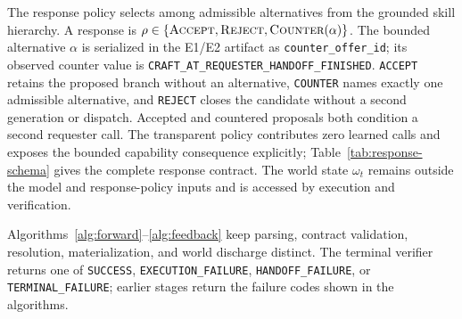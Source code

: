 \documentclass[10pt]{article}
\newcommand{\artifact}[1]{\texttt{#1}}
\begin{document}
The response policy selects among admissible alternatives from the grounded skill hierarchy. A response is $\rho\in\{\textsc{Accept},\textsc{Reject},\textsc{Counter}(\alpha)\}$. The bounded alternative $\alpha$ is serialized in the E1/E2 artifact as \artifact{counter\_offer\_id}; its observed counter value is \artifact{CRAFT\_AT\_REQUESTER\_HANDOFF\_FINISHED}. \artifact{ACCEPT} retains the proposed branch without an alternative, \artifact{COUNTER} names exactly one admissible alternative, and \artifact{REJECT} closes the candidate without a second generation or dispatch. Accepted and countered proposals both condition a second requester call. The transparent policy contributes zero learned calls and exposes the bounded capability consequence explicitly; Table~\ref{tab:response-schema} gives the complete response contract. The world state $\omega_t$ remains outside the model and response-policy inputs and is accessed by execution and verification.

Algorithms~\ref{alg:forward}--\ref{alg:feedback} keep parsing, contract validation, resolution, materialization, and world discharge distinct. The terminal verifier returns one of \artifact{SUCCESS}, \artifact{EXECUTION\_FAILURE}, \artifact{HANDOFF\_FAILURE}, or \artifact{TERMINAL\_FAILURE}; earlier stages return the failure codes shown in the algorithms.
\end{document}
